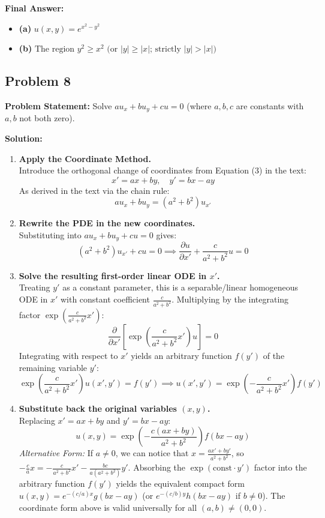 \documentclass[11pt]{article}
\begin{document}
\noindent\textbf{Final Answer:}
\begin{itemize}
    \item \textbf{(a)} $\boxed{u(x, y) = e^{x^2 - y^2}}$
    \item \textbf{(b)} $\boxed{\text{The region } y^2 \ge x^2 \text{ (or } |y| \ge |x| \text{; strictly } |y| > |x|\text{)}}$
\end{itemize}

\hrulefill

\subsection*{Problem 8}
\textbf{Problem Statement:} Solve $au_x + bu_y + cu = 0$ (where $a, b, c$ are constants with $a, b$ not both zero).

\textbf{Solution:}
\begin{enumerate}[label=\textbf{Step \arabic*:}]
    \item \textbf{Apply the Coordinate Method.} \\
    Introduce the orthogonal change of coordinates from Equation (3) in the text:
    \[
    x' = ax + by, \quad y' = bx - ay
    \]
    As derived in the text via the chain rule:
    \[
    au_x + bu_y = (a^2 + b^2)u_{x'}
    \]

    \item \textbf{Rewrite the PDE in the new coordinates.} \\
    Substituting into $au_x + bu_y + cu = 0$ gives:
    \[
    (a^2 + b^2)u_{x'} + cu = 0 \implies \frac{\partial u}{\partial x'} + \frac{c}{a^2 + b^2}u = 0
    \]

    \item \textbf{Solve the resulting first-order linear ODE in $x'$.} \\
    Treating $y'$ as a constant parameter, this is a separable/linear homogeneous ODE in $x'$ with constant coefficient $\frac{c}{a^2 + b^2}$. Multiplying by the integrating factor $\exp\left(\frac{c}{a^2+b^2}x'\right)$:
    \[
    \frac{\partial}{\partial x'}\left[\exp\left(\frac{c}{a^2 + b^2}x'\right)u\right] = 0
    \]
    Integrating with respect to $x'$ yields an arbitrary function $f(y')$ of the remaining variable $y'$:
    \[
    \exp\left(\frac{c}{a^2 + b^2}x'\right)u(x', y') = f(y') \implies u(x', y') = \exp\left(-\frac{c}{a^2 + b^2}x'\right)f(y')
    \]

    \item \textbf{Substitute back the original variables $(x, y)$.} \\
    Replacing $x' = ax + by$ and $y' = bx - ay$:
    \[
    u(x, y) = \exp\left(-\frac{c(ax + by)}{a^2 + b^2}\right)f(bx - ay)
    \]
    \emph{Alternative Form:} If $a \neq 0$, we can notice that $x = \frac{ax' + by'}{a^2 + b^2}$, so $-\frac{c}{a}x = -\frac{c}{a^2+b^2}x' - \frac{bc}{a(a^2+b^2)}y'$. Absorbing the $\exp(\text{const}\cdot y')$ factor into the arbitrary function $f(y')$ yields the equivalent compact form $u(x, y) = e^{-(c/a)x}g(bx - ay)$ (or $e^{-(c/b)y}h(bx - ay)$ if $b \neq 0$). The coordinate form above is valid universally for all $(a, b) \neq (0, 0)$.
\end{enumerate}
\end{document}

